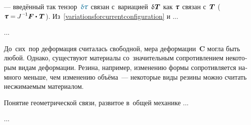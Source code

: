\begin{otherlanguage}{russian}
\vspace{-0.2em} \noindent --- введённый так тензор~${\varbivalent{\hspace{-0.2ex}\cauchystress}}$ связан с~вариацией~$\variation{\hspace{.1ex}\firstpiolakirchhoffstress}$ как $\cauchystress$ связан с~$\bm{T}$ (${\cauchystress = \hspace{-0.1ex} J^{\hspace{.12ex}\expminusone} \bm{F} \dotp \hspace{.16ex} \firstpiolakirchhoffstress\hspace{.2ex}}$). Из~\eqref{variationsforcurrentconfiguration} и ...

...



\end{otherlanguage}



\label{para:internalconstraints}

\begin{otherlanguage}{russian}

До~сих~пор деформация считалась свободной, мера деформации~$\bm{C}$ могла быть любой. Однако, существуют материалы со~значительным сопротивлением некоторым видам деформации. Резина, например, изменению формы сопротивляется намного меньше, чем изменению объёма~--- некоторые виды резины можно считать несжимаемым материалом.

Понятие геометрической связи, развитое в~общей механике ...

...



\end{otherlanguage}




